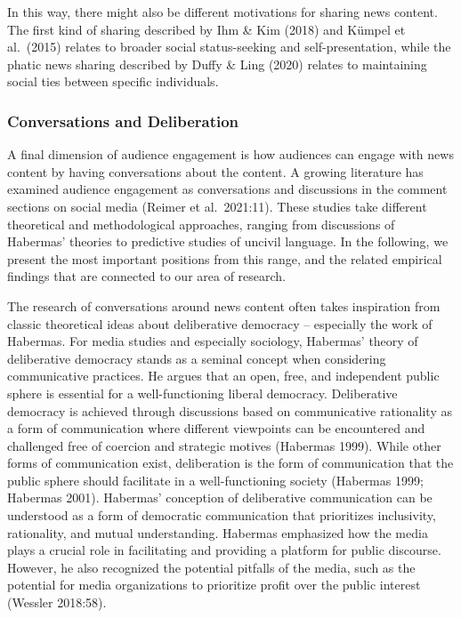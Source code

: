 \documentclass[
]{article}
\begin{document}
In this way, there might also be different motivations for sharing news
content. The first kind of sharing described by Ihm \& Kim (2018) and
Kümpel et al.~(2015) relates to broader social status-seeking and
self-presentation, while the phatic news sharing described by Duffy \&
Ling (2020) relates to maintaining social ties between specific
individuals.

\hypertarget{conversations-and-deliberation}{%
\subsubsection{Conversations and
Deliberation}\label{conversations-and-deliberation}}

\noindent A final dimension of audience engagement is how audiences can
engage with news content by having conversations about the content. A
growing literature has examined audience engagement as conversations and
discussions in the comment sections on social media (Reimer et
al.~2021:11). These studies take different theoretical and
methodological approaches, ranging from discussions of Habermas'
theories to predictive studies of uncivil language. In the following, we
present the most important positions from this range, and the related
empirical findings that are connected to our area of research.

The research of conversations around news content often takes
inspiration from classic theoretical ideas about deliberative democracy
-- especially the work of Habermas. For media studies and especially
sociology, Habermas' theory of deliberative democracy stands as a
seminal concept when considering communicative practices. He argues that
an open, free, and independent public sphere is essential for a
well-functioning liberal democracy. Deliberative democracy is achieved
through discussions based on communicative rationality as a form of
communication where different viewpoints can be encountered and
challenged free of coercion and strategic motives (Habermas 1999). While
other forms of communication exist, deliberation is the form of
communication that the public sphere should facilitate in a
well-functioning society (Habermas 1999; Habermas 2001). Habermas'
conception of deliberative communication can be understood as a form of
democratic communication that prioritizes inclusivity, rationality, and
mutual understanding. Habermas emphasized how the media plays a crucial
role in facilitating and providing a platform for public discourse.
However, he also recognized the potential pitfalls of the media, such as
the potential for media organizations to prioritize profit over the
public interest (Wessler 2018:58).
\end{document}
